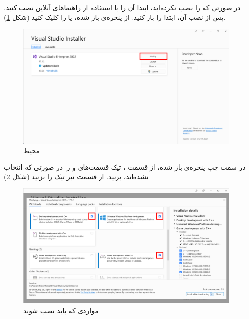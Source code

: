 \textbf{\vspace{-30pt}}
\title{
    \LARGE
}
\textbf{\vspace{-10pt}}

{
    \Large
    \begin{spacing}{1.5}
        در صورتی که  را نصب نکرده‌اید، ابتدا آن را با استفاده از راهنما‌های آنلاین نصب کنید. پس از نصب آن، ابتدا  را باز کنید. از پنجره‌ی باز شده،  یا  را کلیک کنید (شکل \ref{fig:3.Intro.2.1}).

        \begin{figure}[H]
            \centering
            \setlength{\belowcaptionskip}{-10pt}
            \includegraphics[width=\textwidth]{Images/3/3.Intro.2.1}
            \caption{محیط }
            \label{fig:3.Intro.2.1}
        \end{figure}

        در سمت چپ پنجره‌ی باز شده، از قسمت ، تیک قسمت‌های  و  را در صورتی که انتخاب نشده‌اند، بزنید.
        از قسمت  نیز تیک  را بزنید (شکل \ref{fig:3.Intro.2.2}).

        \begin{figure}[H]
            \centering
            \setlength{\belowcaptionskip}{-10pt}
            \includegraphics[width=\textwidth]{Images/3/3.Intro.2.2}
            \caption{مواردی که باید نصب شوند}
            \label{fig:3.Intro.2.2}
        \end{figure}


\end{spacing}}
